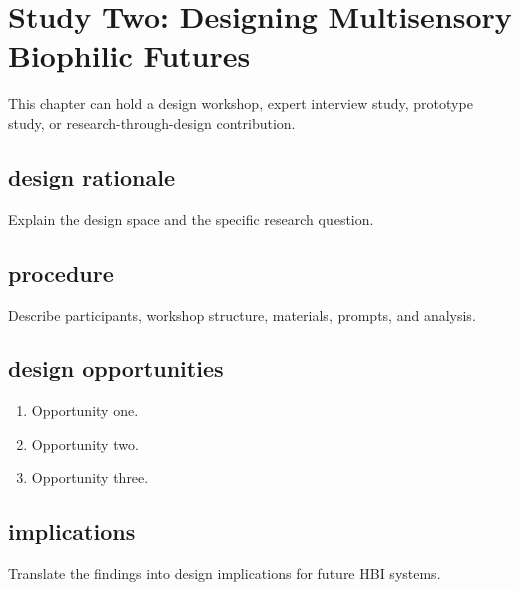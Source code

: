 \chapter{Study Two: Designing Multisensory Biophilic Futures}\label{ch:study-two}

\begin{synopsis}
This chapter can hold a design workshop, expert interview study, prototype study, or research-through-design contribution.
\end{synopsis}

\section{design rationale}
Explain the design space and the specific research question.

\section{procedure}
Describe participants, workshop structure, materials, prompts, and analysis.

\section{design opportunities}
\begin{enumerate}
  \item Opportunity one.
  \item Opportunity two.
  \item Opportunity three.
\end{enumerate}

\section{implications}
Translate the findings into design implications for future HBI systems.
